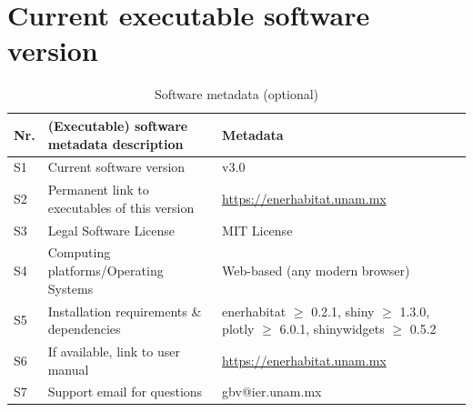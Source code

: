 \documentclass[preprint,12pt, a4paper]{elsarticle}
\begin{document}



\section*{Current executable software version}

\begin{table}[!h]
\begin{tabular}{|l|p{6.5cm}|p{6.5cm}|}
\hline
\textbf{Nr.} & \textbf{(Executable) software metadata description} & \textbf{Metadata} \\
\hline
S1 & Current software version & v3.0 \\
\hline
S2 & Permanent link to executables of this version & \url{https://enerhabitat.unam.mx} \\
\hline
S3 & Legal Software License & MIT License \\
\hline
S4 & Computing platforms/Operating Systems & Web-based (any modern browser) \\
\hline
S5 & Installation requirements \& dependencies & enerhabitat $\geq$ 0.2.1, shiny $\geq$ 1.3.0, plotly $\geq$ 6.0.1, shinywidgets $\geq$ 0.5.2 \\
\hline
S6 & If available, link to user manual & \url{https://enerhabitat.unam.mx} \\
\hline
S7 & Support email for questions & gbv@ier.unam.mx \\
\hline
\end{tabular}
\caption{Software metadata (optional)}
\label{executableMetadata}
\end{table}
\end{document}

